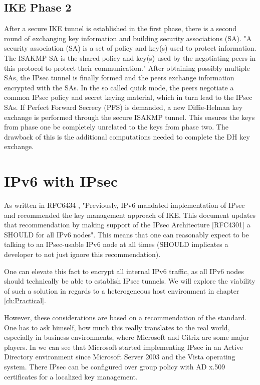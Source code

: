 \documentclass[a4paper]{report}
\begin{document}
\subsection{IKE Phase 2}
\label{ssec:Phase2}
After a secure IKE tunnel is established in the first phase, there is a second round of exchanging key information and building security associations (SA). "A security association (SA) is a set of policy and key(s) used to protect information. The ISAKMP SA is the shared policy and key(s) used by the negotiating peers in this protocol to protect their communication." \parencite{Harkins1998} After obtaining possibly multiple SAs, the IPsec tunnel is finally formed and the peers exchange information encrypted with the SAs. In the so called quick mode, the peers negotiate a common IPsec policy and secret keying material, which in turn lead to the IPsec SAs. If Perfect Forward Secrecy (PFS) is demanded, a new Diffie-Helman key exchange is performed through the secure ISAKMP tunnel. This ensures the keys from phase one be completely unrelated to the keys from phase two. The drawback of this is the additional computations needed to complete the DH key exchange.

\section{IPv6 with IPsec}
\label{sec:IPv6IPsec}

As written in RFC6434 \parencite{Jankiewicz2011}, "Previously, IPv6 mandated implementation of IPsec and recommended the key management approach of IKE. This document updates that recommendation by making support of the IPsec Architecture [RFC4301] a SHOULD for all IPv6 nodes". This means that one can reasonably expect to be talking to an IPsec-usable IPv6 node at all times (SHOULD implicates a developer to not just ignore this recommendation).

One can elevate this fact to encrypt all internal IPv6 traffic, as all IPv6 nodes should technically be able to establish IPsec tunnels. We will explore the viability of such a solution in regards to a heterogeneous host environment in chapter \ref{ch:Practical}.

However, these considerations are based on a recommendation of the standard. One has to ask himself, how much this really translates to the real world, especially in business environments, where Microsoft and Citrix are some major players.
In \cite{MicrosoftTechnet2003} we can see that Microsoft started implementing IPsec in an Active Directory environment since Microsoft Server 2003 and the Vista operating system. There IPsec can be configured over group policy with AD x.509 certificates for a localized key management.
\end{document}

